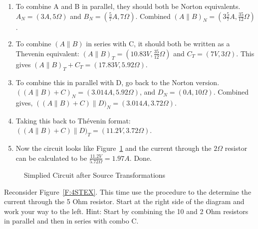 \begin{enumerate}
\item To combine A and B in parallel, they should both be Norton equivalents. $A_N=(3A,5\Omega)$ and $B_N=(\frac{5}{7}A,7\Omega)$. Combined $(A\parallel B)_N=(3\frac{5}{7}A,\frac{35}{12}\Omega)$.
\item To combine $(A \parallel B)$ in series with C, it should both be written as a  Thevenin equivalent: $(A \parallel B)_T = (10.83V, \frac{35}{12}\Omega)$ and $C_T=(7V,3\Omega)$. This gives $(A \parallel B)_T+C_T = (17.83V,5.92\Omega)$.
\item To combine this in parallel with D, go back to the Norton version. $((A \parallel B)+C)_N = (3.014A,5.92\Omega)$, and $D_N=(0A, 10\Omega)$. Combined gives, $((A \parallel B)+C)\parallel D)_N=(3.014A,3.72\Omega)$.
\item Taking this back to Th\'{e}venin format: $((A \parallel B)+C)\parallel D)_T=(11.2V,3.72\Omega)$.
\item Now the circuit looks like Figure~\ref{F:Simplified} and the current through the $2 \Omega$ resistor can be calculated to be $\frac{11.2V}{5.72\Omega} = 1.97 A$. Done.
\end{enumerate}

\begin{figure}[H]
\begin{center}
\caption{Simplied Circuit after Source Transformations}
\label{F:Simplified}
\end{center}
\end{figure}

\begin{clevel}
Reconsider Figure~\ref{F:4STEX}. This time use the procedure to the determine the current through the 5 Ohm resistor. Start at the right side of the diagram and work your way to the left. Hint: Start by combining the 10 and 2 Ohm resistors in parallel and then in series with combo C.
\end{clevel}

